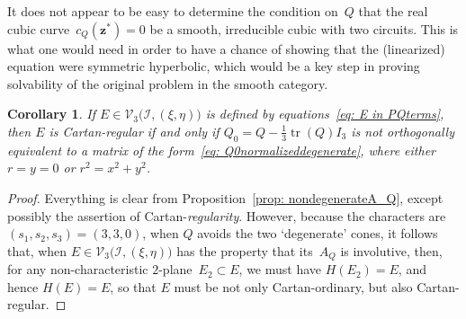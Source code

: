 \documentclass[11pt]{article}
\numberwithin{equation}{section}
\newtheorem{Corollary}[Theorem]{Corollary}
\newcommand{\cI}{{\mathcal I}}
\newcommand{\cV}{{\mathcal V}}
\newcommand{\mbz}{\mathbf{z}}
\DeclareMathOperator{\tr}{tr}
\begin{document}
\begin{Remark}\label{rem: Q-hyperbolicity}
It does not appear to be easy to determine the condition on~$Q$
that the real cubic curve~$c_Q(\mbz^*) = 0$ be a smooth,
irreducible cubic with two circuits. This is what one would need
in order to have a chance of showing that the (linearized) equation
were symmetric hyperbolic, which would be a key step in proving
solvability of the original problem in the smooth category.
\end{Remark}

\begin{Corollary}\label{cor: ECartan-ordinary}
If $E\in \cV_3\bigl(\cI,(\xi,\eta)\bigr)$
is defined by equations~\eqref{eq: E in PQterms},
then $E$ is Cartan-regular
if and only if $Q_0 = Q - \tfrac13\tr(Q)I_3$
is not orthogonally equivalent
to a matrix of the form~\eqref{eq: Q0normalizeddegenerate},
where either $r = y =0$ or $r^2 = x^2+y^2$.
\end{Corollary}

\begin{proof}
Everything is clear from Proposition~\ref{prop: nondegenerateA_Q},
except possibly the assertion of Cartan-\emph{regularity}.
However, because the characters are~$(s_1,s_2,s_3)=(3,3,0)$,
when $Q$ avoids the two `degenerate' cones, it follows that,
when $E\in\cV_3\bigl(\cI,(\xi,\eta)\bigr)$ has the property
that its~$A_Q$ is involutive, then, for any non-characteristic
$2$-plane~$E_2\subset E$, we must have $H(E_2) = E$, and hence
$H(E)=E$, so that $E$ must be not only Cartan-ordinary, but
also Cartan-regular.
\end{proof}
\end{document}

